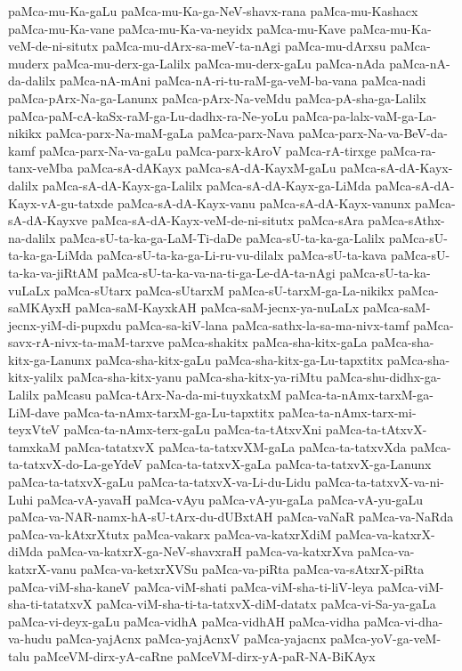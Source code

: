 {paMca-mu-Ka-gaLu
paMca-mu-Ka-ga-NeV-shavx-rana
paMca-mu-Kashacx
paMca-mu-Ka-vane
paMca-mu-Ka-va-neyidx
paMca-mu-Kave
paMca-mu-Ka-veM-de-ni-situtx
paMca-mu-dArx-sa-meV-ta-nAgi
paMca-mu-dArxsu
paMca-muderx
paMca-mu-derx-ga-Lalilx
paMca-mu-derx-gaLu
paMca-nAda
paMca-nA-da-dalilx
paMca-nA-mAni
paMca-nA-ri-tu-raM-ga-veM-ba-vana
paMca-nadi
paMca-pArx-Na-ga-Lanunx
paMca-pArx-Na-veMdu
paMca-pA-sha-ga-Lalilx
paMca-paM-cA-kaSx-raM-ga-Lu-dadhx-ra-Ne-yoLu
paMca-pa-lalx-vaM-ga-La-nikikx
paMca-parx-Na-maM-gaLa
paMca-parx-Nava
paMca-parx-Na-va-BeV-da-kamf
paMca-parx-Na-va-gaLu
paMca-parx-kAroV
paMca-rA-tirxge
paMca-ra-tanx-veMba
paMca-sA-dAKayx
paMca-sA-dA-KayxM-gaLu
paMca-sA-dA-Kayx-dalilx
paMca-sA-dA-Kayx-ga-Lalilx
paMca-sA-dA-Kayx-ga-LiMda
paMca-sA-dA-Kayx-vA-gu-tatxde
paMca-sA-dA-Kayx-vanu
paMca-sA-dA-Kayx-vanunx
paMca-sA-dA-Kayxve
paMca-sA-dA-Kayx-veM-de-ni-situtx
paMca-sAra
paMca-sAthx-na-dalilx
paMca-sU-ta-ka-ga-LaM-Ti-daDe
paMca-sU-ta-ka-ga-Lalilx
paMca-sU-ta-ka-ga-LiMda
paMca-sU-ta-ka-ga-Li-ru-vu-dilalx
paMca-sU-ta-kava
paMca-sU-ta-ka-va-jiRtAM
paMca-sU-ta-ka-va-na-ti-ga-Le-dA-ta-nAgi
paMca-sU-ta-ka-vuLaLx
paMca-sUtarx
paMca-sUtarxM
paMca-sU-tarxM-ga-La-nikikx
paMca-saMKAyxH
paMca-saM-KayxkAH
paMca-saM-jecnx-ya-nuLaLx
paMca-saM-jecnx-yiM-di-pupxdu
paMca-sa-kiV-lana
paMca-sathx-la-sa-ma-nivx-tamf
paMca-savx-rA-nivx-ta-maM-tarxve
paMca-shakitx
paMca-sha-kitx-gaLa
paMca-sha-kitx-ga-Lanunx
paMca-sha-kitx-gaLu
paMca-sha-kitx-ga-Lu-tapxtitx
paMca-sha-kitx-yalilx
paMca-sha-kitx-yanu
paMca-sha-kitx-ya-riMtu
paMca-shu-didhx-ga-Lalilx
paMcasu
paMca-tArx-Na-da-mi-tuyxkatxM
paMca-ta-nAmx-tarxM-ga-LiM-dave
paMca-ta-nAmx-tarxM-ga-Lu-tapxtitx
paMca-ta-nAmx-tarx-mi-teyxVteV
paMca-ta-nAmx-terx-gaLu
paMca-ta-tAtxvXni
paMca-ta-tAtxvX-tamxkaM
paMca-tatatxvX
paMca-ta-tatxvXM-gaLa
paMca-ta-tatxvXda
paMca-ta-tatxvX-do-La-geYdeV
paMca-ta-tatxvX-gaLa
paMca-ta-tatxvX-ga-Lanunx
paMca-ta-tatxvX-gaLu
paMca-ta-tatxvX-va-Li-du-Lidu
paMca-ta-tatxvX-va-ni-Luhi
paMca-vA-yavaH
paMca-vAyu
paMca-vA-yu-gaLa
paMca-vA-yu-gaLu
paMca-va-NAR-namx-hA-sU-tArx-du-dUBxtAH
paMca-vaNaR
paMca-va-NaRda
paMca-va-kAtxrXtutx
paMca-vakarx
paMca-va-katxrXdiM
paMca-va-katxrX-diMda
paMca-va-katxrX-ga-NeV-shavxraH
paMca-va-katxrXva
paMca-va-katxrX-vanu
paMca-va-ketxrXVSu
paMca-va-piRta
paMca-va-sAtxrX-piRta
paMca-viM-sha-kaneV
paMca-viM-shati
paMca-viM-sha-ti-liV-leya
paMca-viM-sha-ti-tatatxvX
paMca-viM-sha-ti-ta-tatxvX-diM-datatx
paMca-vi-Sa-ya-gaLa
paMca-vi-deyx-gaLu
paMca-vidhA
paMca-vidhAH
paMca-vidha
paMca-vi-dha-va-hudu
paMca-yajAcnx
paMca-yajAcnxV
paMca-yajacnx
paMca-yoV-ga-veM-talu
paMceVM-dirx-yA-caRne
paMceVM-dirx-yA-paR-NA-BiKAyx
}

